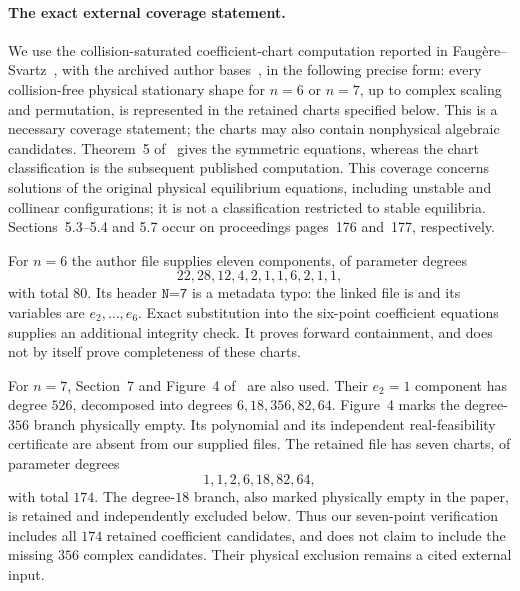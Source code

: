\documentclass[11pt]{article}
\theoremstyle{remark}
\numberwithin{equation}{section}
\begin{document}
\paragraph{The exact external coverage statement.}
We use the collision-saturated coefficient-chart computation reported in
Faug\`ere--Svartz~\cite[Sections~5.3--5.7]{FS}, with the archived
author bases~\cite{FSdata,FSdataSeven}, in the following precise form:
every collision-free physical stationary shape for $n=6$ or $n=7$,
up to complex scaling and permutation, is represented in the retained
charts specified below. This is a necessary coverage statement; the
charts may also contain nonphysical algebraic candidates. Theorem~5
of~\cite{FS} gives the symmetric equations, whereas the chart
classification is the subsequent published computation.
This coverage concerns solutions of the original physical equilibrium
equations, including unstable and collinear configurations; it is not a
classification restricted to stable equilibria. Sections~5.3--5.4 and
5.7 occur on proceedings pages~176 and~177, respectively.

For $n=6$ the author file supplies eleven components, of parameter
degrees
\[
 22,28,12,4,2,1,1,6,2,1,1,
\]
with total $80$. Its header $\texttt{N=7}$ is a metadata typo: the
linked file is  and its variables are
$e_2,\ldots,e_6$. Exact substitution into the six-point coefficient
equations supplies an additional integrity check. It proves forward
containment, and does not by itself prove completeness of these charts.

For $n=7$, Section~7 and Figure~4 of~\cite[p.~178]{FS} are also used. Their
$e_2=1$ component has degree $526$, decomposed into degrees
$6,18,356,82,64$. Figure~4 marks the degree-$356$ branch physically
empty. Its polynomial and its independent real-feasibility certificate
are absent from our supplied files. The retained file has seven charts,
of parameter degrees
\[
 1,1,2,6,18,82,64,
\]
with total $174$. The degree-$18$ branch, also marked physically
empty in the paper, is retained and independently excluded below.
Thus our seven-point verification includes all $174$ retained
coefficient candidates, and does not claim to include the missing
$356$ complex candidates. Their physical exclusion remains a cited
external input.
\end{document}

